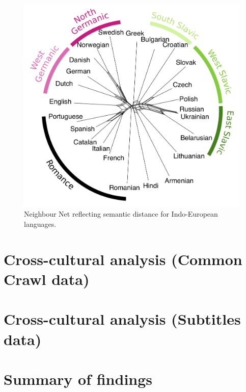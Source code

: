 \documentclass[notitlepage]{report}
\begin{document}
\begin{figure}[p]
\begin{center}
\includegraphics[width=\linewidth]{../results/splitstree/LinguisticDistances_IE_new2.pdf}
\caption{Neighbour Net reflecting semantic distance for Indo-European languages.}
\label{fig:NNIE}
\end{center}
\end{figure}

\clearpage
\newpage
\section{Cross-cultural analysis (Common Crawl data)}



\newpage
\section{Cross-cultural analysis (Subtitles data)}
 


\newpage
\section{Summary of findings}


\end{document}
